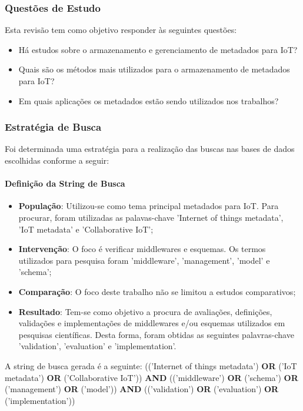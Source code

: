 \subsubsection{Questões de Estudo}
\quad Esta revisão tem como objetivo responder às seguintes questões:
\begin{itemize}
  \item Há estudos sobre o armazenamento e gerenciamento de metadados para \acrlong{IoT}?
  \item Quais são os métodos mais utilizados para o armazenamento de metadados para \acrshort{IoT}?
  \item Em quais aplicações os metadados estão sendo utilizados nos trabalhos?
\end{itemize}

\subsubsection{Estratégia de Busca}
\quad Foi determinada uma estratégia para a realização das buscas nas bases de dados escolhidas conforme a seguir:

\paragraph{Definição da String de Busca}
\begin{itemize}
  \item \textbf{População}: Utilizou-se como tema principal metadados para \acrshort{IoT}. Para procurar, foram utilizadas as palavas-chave 'Internet of things metadata', 'IoT metadata' e 'Collaborative IoT';
  \item \textbf{Intervenção}: O foco é verificar middlewares e esquemas. Os termos utilizados para pesquisa foram 'middleware', 'management', 'model' e 'schema';
  \item \textbf{Comparação}: O foco deste trabalho não se limitou a estudos comparativos;
  \item \textbf{Resultado}: Tem-se como objetivo a procura de avaliações, definições, validações e implementações de middlewares e/ou esquemas utilizados em pesquisas científicas. Desta forma, foram obtidas as seguintes palavras-chave
  'validation', 'evaluation' e 'implementation'.
\end{itemize}

\quad A string de busca gerada é a seguinte:
(('Internet of things metadata') \textbf{OR} ('IoT metadata') \textbf{OR} ('Collaborative IoT')) \textbf{AND} (('middleware') \textbf{OR} ('schema') \textbf{OR} ('management') \textbf{OR} ('model')) \textbf{AND} (('validation') \textbf{OR} ('evaluation') \textbf{OR} ('implementation'))

